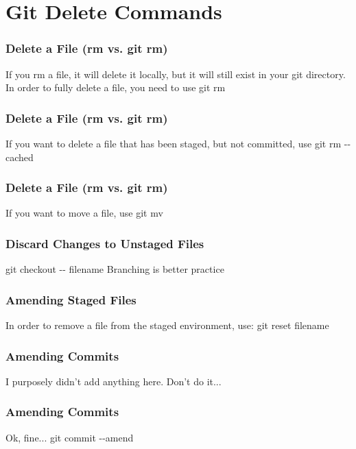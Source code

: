 
\section[Deleting]{Git Delete Commands}

\begin{frame}
\frametitle{\large Delete a File (rm vs. git rm)}
If you rm a file, it will delete it locally, but it will still exist in your git directory. In order to fully delete a file, you need to use git rm
\end{frame}
\note{}

\begin{frame}
\frametitle{\large Delete a File (rm vs. git rm)}
If you want to delete a file that has been staged, but not committed, use git rm -{}-cached
\end{frame}
\note{}

\begin{frame}
\frametitle{\large Delete a File (rm vs. git rm)}
If you want to move a file, use git mv
\end{frame}
\note{}

\begin{frame}
\frametitle{\large Discard Changes to Unstaged Files}
git checkout -{}- filename
Branching is better practice
\end{frame}
\note{}

\begin{frame}
\frametitle{\large Amending Staged Files}
In order to remove a file from the staged environment, use:
git reset filename
\end{frame}
\note{}

\begin{frame}
\frametitle{\large Amending Commits}
I purposely didn't add anything here. Don't do it...
\end{frame}
\note{}

\begin{frame}
\frametitle{\large Amending Commits}
Ok, fine...
git commit -{}-amend
\end{frame}
\note{}